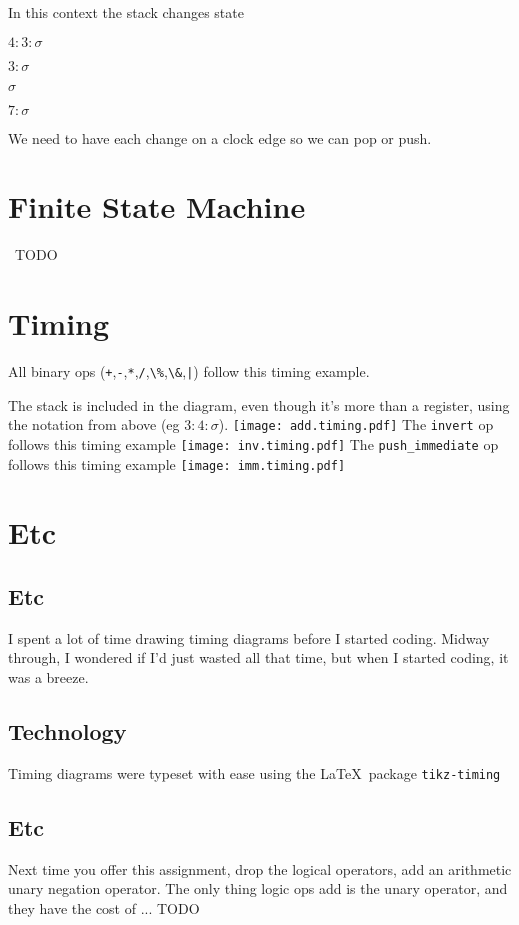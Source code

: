 \documentclass{article}
\begin{document}
\begin{multicols}{2}
In this context the stack changes state
\begin{center} $4:3:\sigma$ \end{center}
\begin{center}   $3:\sigma$ \end{center}
\begin{center}     $\sigma$ \end{center}
\begin{center}   $7:\sigma$ \end{center}

We need to have each change on a clock edge so we can pop or push.
\section{Finite State Machine}\
TODO
\section{Timing}

All binary ops (\verb'+',\verb'-',\verb'*',\verb'/',\verb'\%',\verb'\&',\verb'|')
follow this timing example.

The stack is included in the diagram, even though it's more than a register,
using the notation from above (eg $3:4:\sigma$).
\texttt{[image: add.timing.pdf]}
The \verb'invert' op follows this timing example
\texttt{[image: inv.timing.pdf]}
The \verb'push_immediate' op follows this timing example
\texttt{[image: imm.timing.pdf]}

\section{Etc}
\subsection{Etc}
I spent a lot of time drawing timing diagrams before I started coding.
Midway through, I wondered if I'd just wasted all that time, but when I started coding, it was a breeze.
\subsection{Technology}
Timing diagrams were typeset with ease using the \LaTeX\ package \verb'tikz-timing' 
\subsection{Etc}
Next time you offer this assignment, drop the logical operators, add an arithmetic unary negation operator.
The only thing logic ops add is the unary operator, and they have the cost of ... TODO

\end{multicols}
\end{document}
